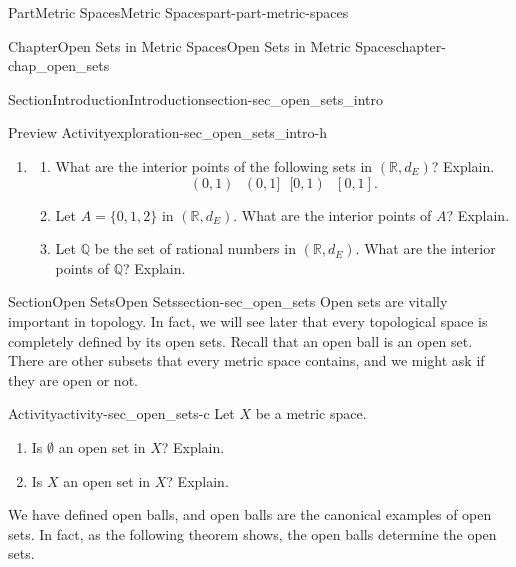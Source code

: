 \documentclass[oneside,10pt,]{book}
\numberwithin{equation}{chapter}
\newcommand{\Q}{\mathbb{Q}}
\newcommand{\R}{\mathbb{R}}
\newcommand{\amp}{&}
\begin{document}
\begin{partptx}{Part}{Metric Spaces}{}{Metric Spaces}{}{}{part-part-metric-spaces}
\begin{chapterptx}{Chapter}{Open Sets in Metric Spaces}{}{Open Sets in Metric Spaces}{}{}{chapter-chap_open_sets}
\begin{sectionptx}{Section}{Introduction}{}{Introduction}{}{}{section-sec_open_sets_intro}
\begin{exploration}{Preview Activity}{}{exploration-sec_open_sets_intro-h}
\begin{enumerate}[font=\bfseries,label=(\alph*),ref=\alph*]
\begin{enumerate}[font=\bfseries,label=(\roman*),ref=\theenumi.\roman*]
\item{}\(X = \{a,b,c,d\}\), \(d\) is the discrete metric defined by%
\begin{equation*}
d(x,y) = \begin{cases}0 \amp \text{ if }  x = y \\ 1 \amp \text{ if }  x \neq y, \end{cases}
\end{equation*}
and \(A = \{a,b\}\).%
\end{enumerate}%
\item{}\begin{enumerate}[font=\bfseries,label=(\roman*),ref=\theenumi.\roman*]%
\item{}What are the interior points of the following sets in \((\R, d_E)\)? Explain.%
\begin{equation*}
(0,1) \ \ \ (0,1] \ \ \ [0,1) \ \ \ [0,1]\text{.}
\end{equation*}
%
\item{}Let \(A = \{0, 1, 2\}\) in \((\R, d_E)\). What are the interior points of \(A\)? Explain.%
\item{}Let \(\Q\) be the set of rational numbers in \((\R, d_E)\). What are the interior points of \(\Q\)? Explain.%
\end{enumerate}%
\end{enumerate}%
\end{exploration}%
\end{sectionptx}
%
%
\typeout{************************************************}
\typeout{************************************************}
%
\begin{sectionptx}{Section}{Open Sets}{}{Open Sets}{}{}{section-sec_open_sets}
Open sets are vitally important in topology. In fact, we will see later that every topological space is completely defined by its open sets. Recall that an open ball is an open set. There are other subsets that every metric space contains, and we might ask if they are open or not.%
\begin{activity}{Activity}{}{activity-sec_open_sets-c}%
Let \(X\) be a metric space.%
\begin{enumerate}[font=\bfseries,label=(\alph*),ref=\alph*]%
\item{}Is \(\emptyset\) an open set in \(X\)? Explain.%
\item{}Is \(X\) an open set in \(X\)? Explain.%
\end{enumerate}%
\end{activity}%
We have defined open balls, and open balls are the canonical examples of open sets. In fact, as the following theorem shows, the open balls determine the open sets.%

\end{sectionptx}
\end{chapterptx}
\end{partptx}
\end{document}
